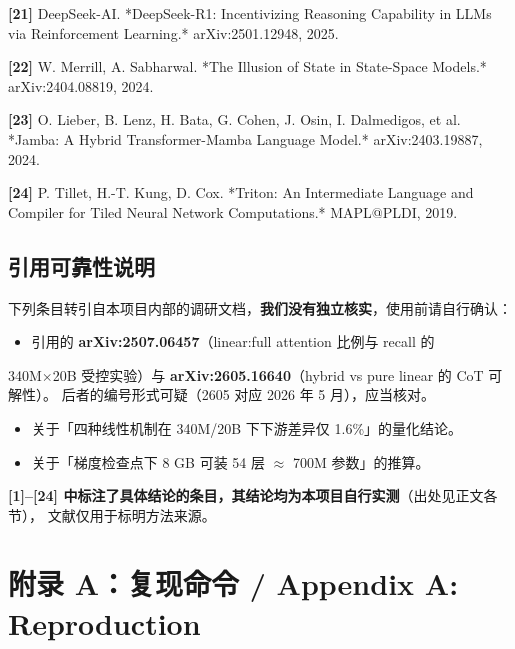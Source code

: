 \documentclass[11pt,openany]{ctexart}
\begin{document}
\textbf{[21]} DeepSeek-AI. *DeepSeek-R1: Incentivizing Reasoning Capability in LLMs via Reinforcement Learning.* arXiv:2501.12948, 2025.

\textbf{[22]} W. Merrill, A. Sabharwal. *The Illusion of State in State-Space Models.* arXiv:2404.08819, 2024.

\textbf{[23]} O. Lieber, B. Lenz, H. Bata, G. Cohen, J. Osin, I. Dalmedigos, et al. *Jamba: A Hybrid Transformer-Mamba Language Model.* arXiv:2403.19887, 2024.

\textbf{[24]} P. Tillet, H.-T. Kung, D. Cox. *Triton: An Intermediate Language and Compiler for Tiled Neural Network Computations.* MAPL@PLDI, 2019.

\reportrule

\subsection{引用可靠性说明}

下列条目转引自本项目内部的调研文档，\textbf{我们没有独立核实}，使用前请自行确认：

\begin{itemize}
  \item {} 引用的 \textbf{arXiv:2507.06457}（linear:full attention 比例与 recall 的
\end{itemize}

340M$\times$20B 受控实验）与 \textbf{arXiv:2605.16640}（hybrid vs pure linear 的 CoT 可解性）。 后者的编号形式可疑（2605 对应 2026 年 5 月），应当核对。

\begin{itemize}
  \item {} 关于「四种线性机制在 340M/20B 下下游差异仅 1.6\%」的量化结论。
\end{itemize}
\begin{itemize}
  \item {} 关于「梯度检查点下 8 GB 可装 54 层 $\approx$ 700M 参数」的推算。
\end{itemize}

\textbf{[1]–[24] 中标注了具体结论的条目，其结论均为本项目自行实测}（出处见正文各节）， 文献仅用于标明方法来源。

\reportrule

\startappendix

\section{附录 A：复现命令 / Appendix A: Reproduction}
\end{document}

